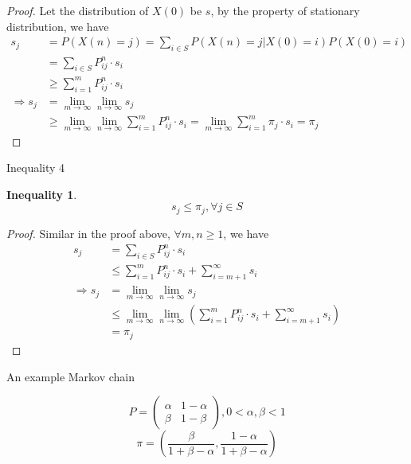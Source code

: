 \documentclass[mathserif]{beamer}
\newtheorem{ineq}{Inequality}
\begin{document}
\begin{frame}
	\begin{proof}
		Let the distribution of $X(0)$ be $s$, by the property of stationary distribution, we have
		\begin{align*}
			             s_j &= P(X(n)=j) = \sum_{i \in S} P(X(n) = j | X(0) = i)P(X(0) = i) \\
			                 &= \sum_{i \in S} P^n_{ij} \cdot s_i \\
			                 &\geq \sum_{i=1}^m P^n_{ij} \cdot s_i \\
			\Rightarrow  s_j &= \lim_{m \to \infty}\lim_{n \to \infty} s_j \\
			                 &\geq \lim_{m \to \infty}\lim_{n \to \infty} \sum_{i=1}^m P^n_{ij} \cdot s_i
			                  = \lim_{m \to \infty}\sum_{i=1}^m \pi_j \cdot s_i = \pi_j
		\end{align*}
	\end{proof}
\end{frame}

\begin{frame}{Inequality 4}
	\begin{ineq}
		\[
		s_j \leq \pi_j, \forall j \in S
		\]
	\end{ineq}
\end{frame}

\begin{frame}
	\begin{proof}
		Similar in the proof above, $\forall m,n \geq 1$, we have
		\begin{align*}
			            s_j &= \sum_{i \in S} P^n_{ij} \cdot s_i \\
			                &\leq \sum_{i=1}^m P^n_{ij} \cdot s_i + \sum_{i=m+1}^\infty s_i \\
			\Rightarrow s_j &= \lim_{m \to \infty}\lim_{n \to \infty} s_j \\
			                &\leq \lim_{m \to \infty}\lim_{n \to \infty} \left( 
			                	\sum_{i=1}^m P^n_{ij} \cdot s_i + \sum_{i=m+1}^\infty s_i \right) \\
			                &= \pi_j
		\end{align*}
	\end{proof}
\end{frame}

\begin{frame}{An example Markov chain}
	\begin{example}
		\[
		P = 
		\begin{pmatrix}
			\alpha & 1 - \alpha \\
			\beta  & 1 - \beta
		\end{pmatrix},
		0 < \alpha, \beta < 1
		\]
		\[
		\pi = \left( \frac{\beta}{1+\beta-\alpha}, \frac{1-\alpha}{1+\beta-\alpha} \right) 
		\]
	\end{example}
\end{frame}
\end{document}
